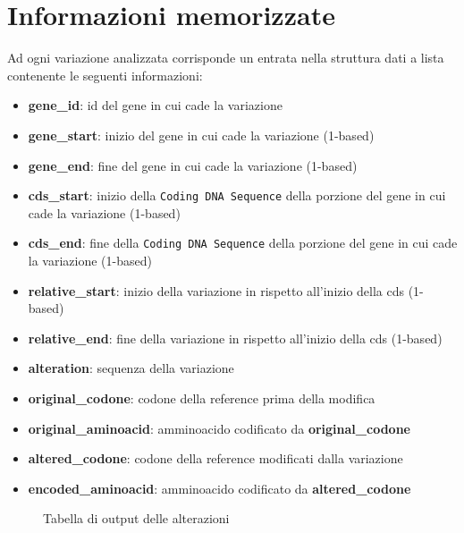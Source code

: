 \documentclass[11pt,italian]{article}
\begin{document}
\section{Informazioni memorizzate}
Ad ogni variazione analizzata corrisponde un entrata nella struttura dati a lista contenente le seguenti informazioni:
\begin{itemize}
    \item \textbf{gene\_id}: id del gene in cui cade la variazione
    \item \textbf{gene\_start}: inizio del gene in cui cade la variazione (1-based)
    \item \textbf{gene\_end}: fine del gene in cui cade la variazione (1-based)
    \item \textbf{cds\_start}: inizio della \lstinline{Coding DNA Sequence} della porzione del gene in cui cade la variazione (1-based)
    \item \textbf{cds\_end}: fine della \lstinline{Coding DNA Sequence} della porzione del gene in cui cade la variazione (1-based)
    \item \textbf{relative\_start}: inizio della variazione in rispetto all'inizio della cds (1-based)
    \item \textbf{relative\_end}: fine della variazione in rispetto all'inizio della cds (1-based)
    \item \textbf{alteration}: sequenza della variazione
    \item \textbf{original\_codone}: codone della reference prima della modifica
    \item \textbf{original\_aminoacid}: amminoacido codificato da \textbf{original\_codone}
    \item \textbf{altered\_codone}: codone della reference modificati dalla variazione
    \item \textbf{encoded\_aminoacid}: amminoacido codificato da \textbf{altered\_codone}
\end{itemize}

\begin{figure}
  \caption{Tabella di output delle alterazioni}
  \label{fig:alteration_table}
\end{figure}
\end{document}
